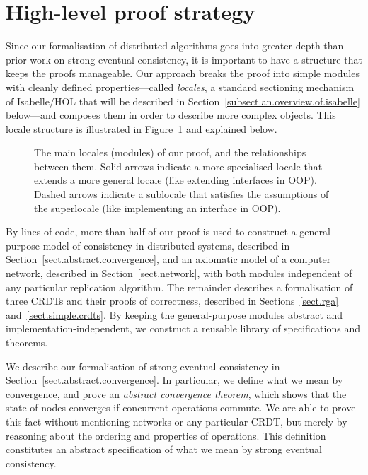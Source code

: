 \section{High-level proof strategy}
\label{sect.high-level.proof.strategy}

Since our formalisation of distributed algorithms goes into greater depth than prior work on strong eventual consistency, it is important to have a structure that keeps the proofs manageable.
Our approach breaks the proof into simple modules with cleanly defined properties---called \emph{locales}, a standard sectioning mechanism of Isabelle/HOL that will be described in Section~\ref{subsect.an.overview.of.isabelle} below---and composes them in order to describe more complex objects.
This locale structure is illustrated in Figure~\ref{fig.proof.structure} and explained below.

\begin{figure}
\centering

\caption{The main locales (modules) of our proof, and the relationships between them.
Solid arrows indicate a more specialised locale that extends a more general locale (like extending interfaces in OOP).
Dashed arrows indicate a sublocale that satisfies the assumptions of the superlocale (like implementing an interface in OOP).
}\label{fig.proof.structure}
\end{figure}

By lines of code, more than half of our proof is used to construct a general-purpose model of consistency in distributed systems, described in Section~\ref{sect.abstract.convergence}, and an axiomatic model of a computer network, described in Section~\ref{sect.network}, with both modules independent of any particular replication algorithm.
The remainder describes a formalisation of three CRDTs and their proofs of correctness, described in Sections~\ref{sect.rga} and~\ref{sect.simple.crdts}.
By keeping the general-purpose modules abstract and implementation-independent, we construct a reusable library of specifications and theorems.

We describe our formalisation of strong eventual consistency in Section~\ref{sect.abstract.convergence}.
In particular, we define what we mean by convergence, and prove an \emph{abstract convergence theorem}, which shows that the state of nodes converges if concurrent operations commute.
We are able to prove this fact without mentioning networks or any particular CRDT, but merely by reasoning about the ordering and properties of operations.
This definition constitutes an abstract specification of what we mean by strong eventual consistency.

